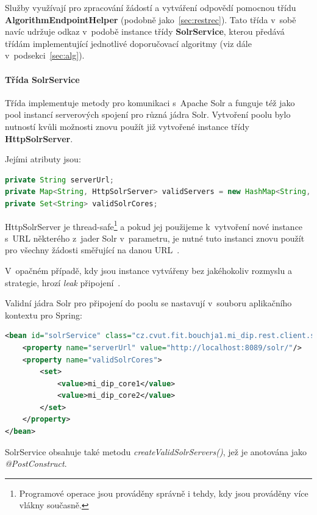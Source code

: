 \documentclass[thesis=M,czech]{FITthesis}[2014/05/07]
\begin{document}
Služby využívají pro zpracování žádostí a vytváření odpovědí pomocnou třídu \textbf{AlgorithmEndpointHelper} (podobně jako~\ref{sec:restrec}). Tato třída v~sobě navíc udržuje odkaz v~podobě instance třídy \textbf{SolrService}, kterou předává třídám implementující jednotlivé doporučovací algoritmy (viz dále v~podsekci~\ref{sec:alg}). 

\paragraph{Třída SolrService}
	
Třída implementuje metody pro komunikaci s~Apache Solr a funguje též jako pool instancí serverových spojení pro různá jádra Solr. Vytvoření poolu bylo nutností kvůli možnosti znovu použít již vytvořené instance třídy \textbf{HttpSolrServer}.

Jejími atributy jsou:

\begin{lstlisting}[language=java]
private String serverUrl;
private Map<String, HttpSolrServer> validServers = new HashMap<String, HttpSolrServer>();
private Set<String> validSolrCores;
\end{lstlisting}

HttpSolrServer je thread-safe\footnote{Programové operace jsou prováděny správně i tehdy, kdy jsou prováděny více vlákny současně.} a pokud jej použijeme k~vytvoření nové instance s~URL některého z~jader Solr v~parametru, je nutné tuto instanci znovu použít pro všechny žádosti směřující na danou URL~\cite{solrj}. 

V~opačném případě, kdy jsou instance vytvářeny bez jakéhokoliv rozmyslu a strategie, hrozí \emph{leak} připojení~\cite{metawerx}.

Validní jádra Solr pro připojení do poolu se nastavují v~souboru aplikačního kontextu pro Spring:

\begin{lstlisting}[language=xml]
<bean id="solrService" class="cz.cvut.fit.bouchja1.mi_dip.rest.client.solr.SolrService">
    <property name="serverUrl" value="http://localhost:8089/solr/"/>
    <property name="validSolrCores">
        <set>
            <value>mi_dip_core1</value>
            <value>mi_dip_core2</value>
        </set>
    </property>        
</bean>  
\end{lstlisting}

SolrService obsahuje také metodu \emph{createValidSolrServers()}, jež je anotována jako \emph{@PostConstruct}.
\end{document}
